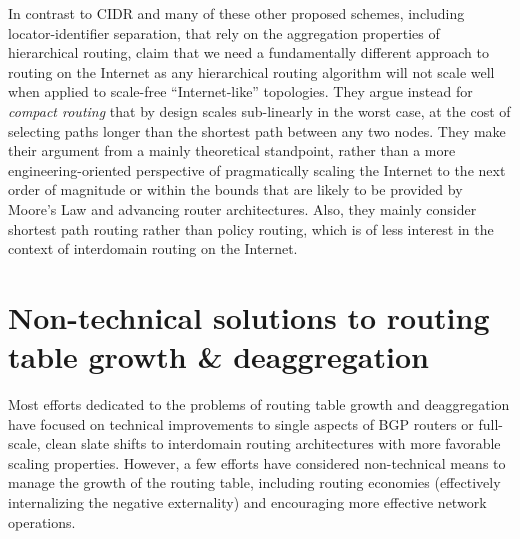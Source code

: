 In contrast to CIDR and many of these other proposed schemes, including
locator-identifier separation, that rely on the aggregation properties of
hierarchical routing, \cite{Krioukov:2007fk} claim that we need a fundamentally
different approach to routing on the Internet as any hierarchical routing
algorithm will not scale well when applied to scale-free ``Internet-like''
topologies. They argue instead for \emph{compact routing} that by design scales
sub-linearly in the worst case, at the cost of selecting paths longer than the
shortest path between any two nodes. They make their argument from a mainly
theoretical standpoint, rather than a more engineering-oriented perspective of
pragmatically scaling the Internet to the next order of magnitude or within the
bounds that are likely to be provided by Moore's Law and advancing router
architectures. Also, they mainly consider shortest path routing rather than
policy routing, which is of less interest in the context of interdomain routing
on the Internet.

\section{Non-technical solutions to routing table growth \& deaggregation}

Most efforts dedicated to the problems of routing table growth and
deaggregation have focused on technical improvements to single aspects of BGP
routers or full-scale, clean slate shifts to interdomain routing architectures
with more favorable scaling properties. However, a few efforts have considered
non-technical means to manage the growth of the routing table, including
routing economies (effectively internalizing the negative externality) and
encouraging more effective network operations.

